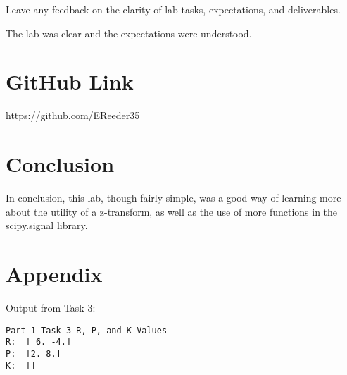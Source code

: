 \documentclass[12pt]{article}
\begin{document}
Leave any feedback on the clarity of lab tasks, expectations, and deliverables.

The lab was clear and the expectations were understood.

\section{GitHub Link}

https://github.com/EReeder35

\section{Conclusion}

In conclusion, this lab, though fairly simple, was a good way of learning more about the utility of a z-transform, as well as the use of more functions in the scipy.signal library.

\newpage

\section{Appendix}

Output from Task 3:

\begin{lstlisting}
Part 1 Task 3 R, P, and K Values
R:  [ 6. -4.]
P:  [2. 8.]
K:  []
\end{lstlisting}
\end{document}

